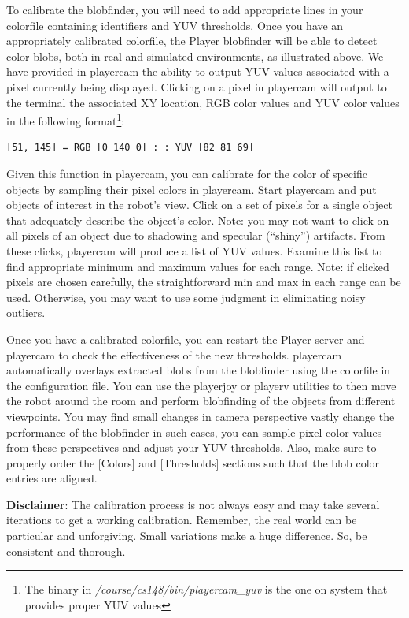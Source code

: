 To calibrate the blobfinder, you will need to add appropriate lines in your colorfile containing identifiers and YUV thresholds.  Once you 
have an appropriately calibrated colorfile, the Player blobfinder will be able to detect color blobs, both in real and simulated 
environments, as illustrated above.  We have provided in playercam the ability to output YUV values associated with a pixel currently 
being displayed.  Clicking on a pixel in playercam will output to the terminal the associated XY location, RGB color values and YUV color 
values in the following format\footnote{The binary in {\it /course/cs148/bin/playercam\_yuv} is the one on system that provides proper YUV 
values}:

\begin{verbatim}
[51, 145] = RGB [0 140 0] : : YUV [82 81 69]
\end{verbatim}

Given this function in playercam, you can calibrate for the color of specific objects by sampling their pixel colors in playercam.  Start 
playercam and put objects of interest in the robot's view.  Click on a set of pixels for a single object that adequately describe the 
object's color.  Note: you may not want to click on all pixels of an object due to shadowing and specular (``shiny'') artifacts.  From 
these clicks, playercam will produce a list of YUV values.  Examine this list to find appropriate minimum and maximum values for each range.  
Note: if clicked pixels are chosen carefully, the straightforward min and max in each range can be used.  Otherwise, you may want to use 
some judgment in eliminating noisy outliers.  

Once you have a calibrated colorfile, you can restart the Player server and playercam to check the effectiveness of the new thresholds.  
playercam automatically overlays extracted blobs from the blobfinder using the colorfile in the configuration file. You can use the playerjoy 
or playerv utilities to then move the robot around the room and perform blobfinding of the objects from different viewpoints.  You may find 
small changes in camera perspective vastly change the performance of the blobfinder in such cases, you can sample pixel color values from 
these perspectives and adjust your YUV thresholds.  Also, make sure to properly order the [Colors] and [Thresholds] sections such that the 
blob color entries are aligned.  

{\bf Disclaimer}: The calibration process is not always easy and may take several iterations to get a working calibration.  Remember, 
the real world can be particular and unforgiving.  Small variations make a huge difference. So, be consistent and thorough.

